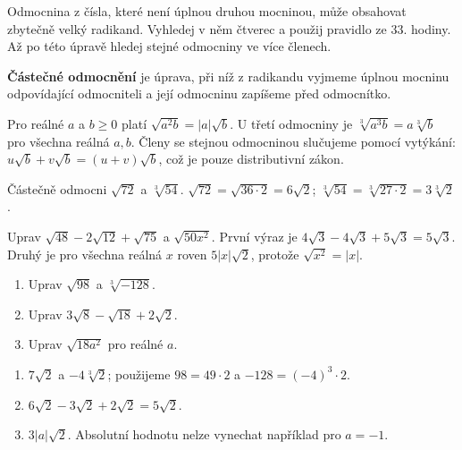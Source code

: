 \documentclass[11pt,a4paper]{article}
\begin{document}

Odmocnina z čísla, které není úplnou druhou mocninou, může obsahovat zbytečně velký radikand. Vyhledej v něm čtverec a použij pravidlo ze 33. hodiny. Až po této úpravě hledej stejné odmocniny ve více členech.

\begin{definiceBox}[title={Definice},breakable=false]
\textbf{Částečné odmocnění} je úprava, při níž z radikandu vyjmeme úplnou mocninu odpovídající odmocniteli a její odmocninu zapíšeme před odmocnítko.
\end{definiceBox}


Pro reálné $a$ a $b\ge0$ platí $\sqrt{a^2b}=|a|\sqrt b$. U třetí odmocniny je $\sqrt[3]{a^3b}=a\sqrt[3]b$ pro všechna reálná $a,b$. Členy se stejnou odmocninou slučujeme pomocí vytýkání: $u\sqrt b+v\sqrt b=(u+v)\sqrt b$, což je pouze distributivní zákon.


\begin{prikladReseniBox}[title={Příklad 1},breakable=false]
Částečně odmocni $\sqrt{72}$ a $\sqrt[3]{54}$.
\tcblower
$\sqrt{72}=\sqrt{36\cdot2}=6\sqrt2$; $\sqrt[3]{54}=\sqrt[3]{27\cdot2}=3\sqrt[3]2$.
\end{prikladReseniBox}


\begin{prikladReseniBox}[title={Příklad 2},breakable=false]
Uprav $\sqrt{48}-2\sqrt{12}+\sqrt{75}$ a $\sqrt{50x^2}$.
\tcblower
První výraz je $4\sqrt3-4\sqrt3+5\sqrt3=5\sqrt3$. Druhý je pro všechna reálná $x$ roven $5|x|\sqrt2$, protože $\sqrt{x^2}=|x|$.
\end{prikladReseniBox}



\begin{zadaniReseniBox}[title={Procvičení},breakable=false]
\begin{enumerate}[label=\alph*)]
\item Uprav $\sqrt{98}$ a $\sqrt[3]{-128}$.
\item Uprav $3\sqrt8-\sqrt{18}+2\sqrt2$.
\item Uprav $\sqrt{18a^2}$ pro reálné $a$.
\end{enumerate}
\tcblower
\begin{enumerate}[label=\alph*)]
\item $7\sqrt2$ a $-4\sqrt[3]2$; použijeme $98=49\cdot2$ a $-128=(-4)^3\cdot2$.
\item $6\sqrt2-3\sqrt2+2\sqrt2=5\sqrt2$.
\item $3|a|\sqrt2$. Absolutní hodnotu nelze vynechat například pro $a=-1$.
\end{enumerate}
\end{zadaniReseniBox}
\end{document}
